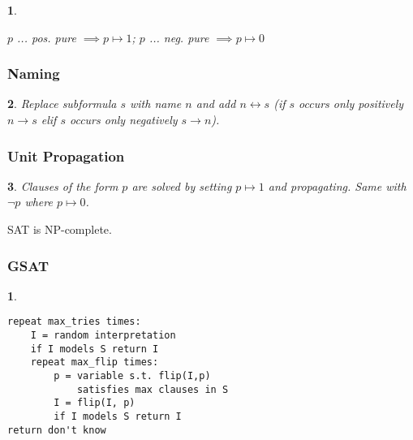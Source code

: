 \documentclass[]{article}
\newtheorem*{red}{}
\newtheorem*{blue}{}
\begin{document}
\begin{multicols}{3}
\begin{minipage}[t]{.31\textwidth}
\begin{blue}
\begin{center}
\end{center}

$p$ ... pos. pure $\implies p \mapsto 1$; $p$ ... neg. pure $\implies p \mapsto 0$

\end{blue}

\subsubsection*{Naming}
\begin{blue}
Replace subformula $s$ with name $n$ and add $n\leftrightarrow s$ (if $s$ occurs only positively $n\rightarrow s$ elif $s$ occurs only negatively $s \rightarrow n$).
\end{blue}

\subsubsection*{Unit Propagation}
\begin{blue}
Clauses of the form $p$ are solved by setting $p \mapsto 1$ and propagating. Same with $\lnot p$ where $p \mapsto 0$.
\end{blue}

SAT is NP-complete.

\subsubsection*{GSAT}
\begin{red}
\begin{verbatim}
repeat max_tries times:
    I = random interpretation
    if I models S return I
    repeat max_flip times:
        p = variable s.t. flip(I,p)
            satisfies max clauses in S
        I = flip(I, p)
        if I models S return I
return don't know	
\end{verbatim}
\end{red}


\end{minipage}
\end{multicols}
\end{document}
